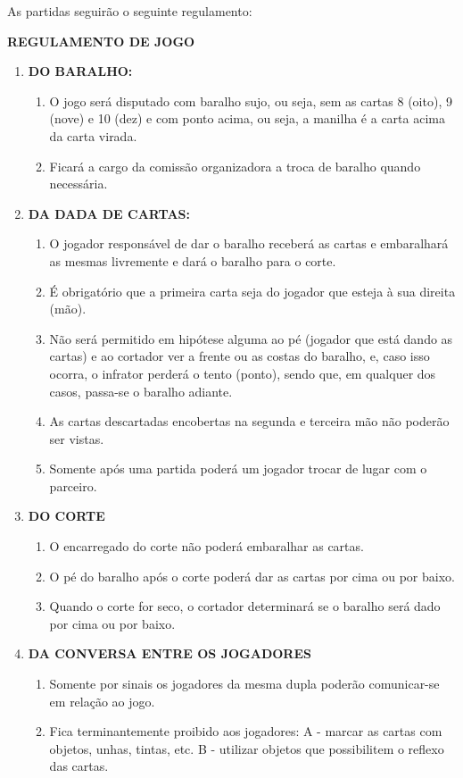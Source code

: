 \begin{article}
	As partidas seguirão o seguinte regulamento:

	\textbf{REGULAMENTO DE JOGO}
	\begin{enumerate}[noitemsep]
		\item \textbf{DO BARALHO:}
		\begin{enumerate}[noitemsep]
			\item O jogo será disputado com baralho sujo, ou seja, sem as cartas 8 (oito), 9 (nove) e 10 (dez) e com ponto acima, ou seja, a manilha é a carta acima da carta virada.
			\item Ficará a cargo da comissão organizadora a troca de baralho quando necessária.
		\end{enumerate}

		\item \textbf{DA DADA DE CARTAS:}
		\begin{enumerate}[noitemsep]
			\item O jogador responsável de dar o baralho receberá as cartas e embaralhará as mesmas livremente e dará o baralho para o corte.
			\item É obrigatório que a primeira carta seja do jogador que esteja à sua direita (mão).
			\item Não será permitido em hipótese alguma ao pé (jogador que está dando as cartas) e ao cortador ver a frente ou as costas do baralho, e, caso isso ocorra, o infrator perderá o tento (ponto), sendo que, em qualquer dos casos, passa-se o baralho adiante.
			\item As cartas descartadas encobertas na segunda e terceira mão não poderão ser vistas.
			\item Somente após uma partida poderá um jogador trocar de lugar com o parceiro.
		\end{enumerate}

		\item \textbf{DO CORTE}
		\begin{enumerate}[noitemsep]
			\item O encarregado do corte não poderá embaralhar as cartas.
			\item O pé do baralho após o corte poderá dar as cartas por cima ou por baixo.
			\item Quando o corte for seco, o cortador determinará se o baralho será dado por cima ou por baixo.
		\end{enumerate}

		\item \textbf{DA CONVERSA ENTRE OS JOGADORES}
		\begin{enumerate}[noitemsep]
			\item Somente por sinais os jogadores da mesma dupla poderão comunicar-se em relação ao jogo.
			\item Fica terminantemente proibido aos jogadores: A - marcar as cartas com objetos, unhas, tintas, etc. B - utilizar objetos que possibilitem o reflexo das cartas.
		\end{enumerate}


\end{enumerate}
\end{article}
